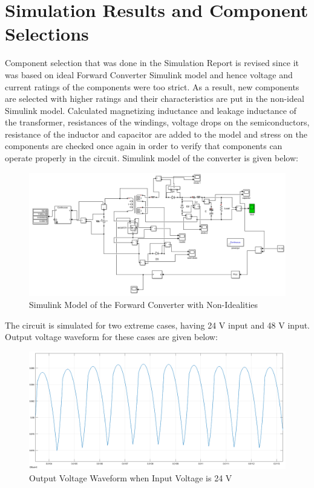\documentclass{article}
\newcommand\tab[1][1cm]{\hspace*{#1}}
\begin{document}
\section*{Simulation Results and Component Selections}
\tab Component selection that was done in the Simulation Report is revised since it was based on ideal Forward Converter Simulink model and hence voltage and current ratings of the components were too strict. As a result, new components are selected with higher ratings and their characteristics are put in the non-ideal Simulink model. Calculated magnetizing inductance and leakage inductance of the transformer, resistances of the windings, voltage drops on the semiconductors, resistance of the inductor and capacitor are added to the model and stress on the components are checked once again in order to verify that components can operate properly in the circuit. Simulink model of the converter is given below:
\begin{figure}[H]
    \centering
    \includegraphics[scale=0.5]{non ideal simulink.PNG}
    \caption{Simulink Model of the Forward Converter with Non-Idealities}
    \label{fig:my_label}
\end{figure}
\tab The circuit is simulated for two extreme cases, having 24 V input and 48 V input. Output voltage waveform for these cases are given below:
\begin{figure}[H]
    \centering
    \includegraphics[scale=0.2]{24v_output.png}
    \caption{Output Voltage Waveform when Input Voltage is 24 V}
    \label{fig:my_label}
\end{figure}
\end{document}
